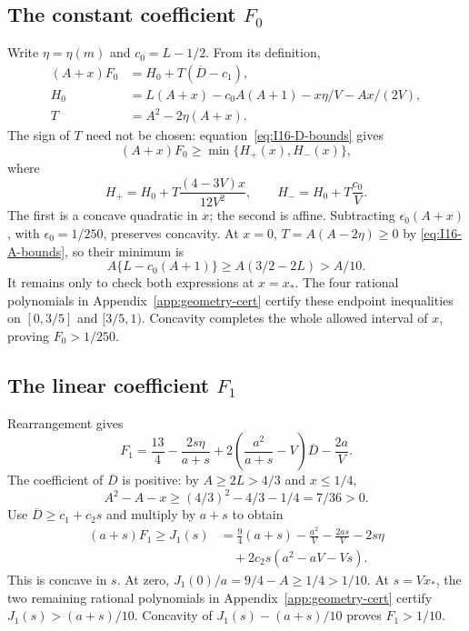 \documentclass[11pt]{article}
\theoremstyle{remark}\newtheorem{remark}[theorem]{Remark}
\numberwithin{equation}{section}
\begin{document}
\subsection{The constant coefficient \texorpdfstring{$F_0$}{F0}}
Write $\eta=\eta(m)$ and $c_0=L-1/2$. From its definition,
\begin{align*}
 (A+x)F_0&=H_0+T(\overline D-c_1),\\
 H_0&=L(A+x)-c_0A(A+1)-x\eta/V-Ax/(2V),\\
 T&=A^2-2\eta(A+x).
\end{align*}
The sign of $T$ need not be chosen: equation~\eqref{eq:I16-D-bounds} gives
\[
 (A+x)F_0\ge\min\{H_+(x),H_-(x)\},
\]
where
\[
 H_+=H_0+T\frac{(4-3V)x}{12V^2},\qquad
 H_-=H_0+T\frac{c_0}{V}.
\]
The first is a concave quadratic in $x$; the second is affine. Subtracting
$\epsilon_0(A+x)$, with $\epsilon_0=1/250$, preserves concavity. At $x=0$,
$T=A(A-2\eta)\ge0$ by \eqref{eq:I16-A-bounds}, so their minimum is
\[
 A\{L-c_0(A+1)\}\ge A(3/2-2L)>A/10.
\]
It remains only to check both expressions at $x=x_*$. The four rational
polynomials in Appendix~\ref{app:geometry-cert} certify these endpoint
inequalities on $[0,3/5]$ and $[3/5,1)$. Concavity completes the whole
allowed interval of $x$, proving $F_0>1/250$.

\subsection{The linear coefficient \texorpdfstring{$F_1$}{F1}}
Rearrangement gives
\[
 F_1=\frac{13}{4}-\frac{2s\eta}{a+s}
 +2\left(\frac{a^2}{a+s}-V\right)\overline D-\frac{2a}{V}.
\]
The coefficient of $\overline D$ is positive: by $A\ge2L>4/3$ and
$x\le1/4$,
\[
 A^2-A-x\ge(4/3)^2-4/3-1/4=7/36>0.
\]
Use $\overline D\ge c_1+c_2s$ and multiply by $a+s$ to obtain
\begin{align*}
 (a+s)F_1\ge J_1(s)
 &=\frac94(a+s)-\frac{a^2}{V}-\frac{2as}{V}-2s\eta\\
 &\quad+2c_2s(a^2-aV-Vs).
\end{align*}
This is concave in $s$. At zero,
$J_1(0)/a=9/4-A\ge1/4>1/10$. At $s=Vx_*$, the two remaining rational
polynomials in Appendix~\ref{app:geometry-cert} certify
$J_1(s)>(a+s)/10$. Concavity of $J_1(s)-(a+s)/10$ proves $F_1>1/10$.
\end{document}
